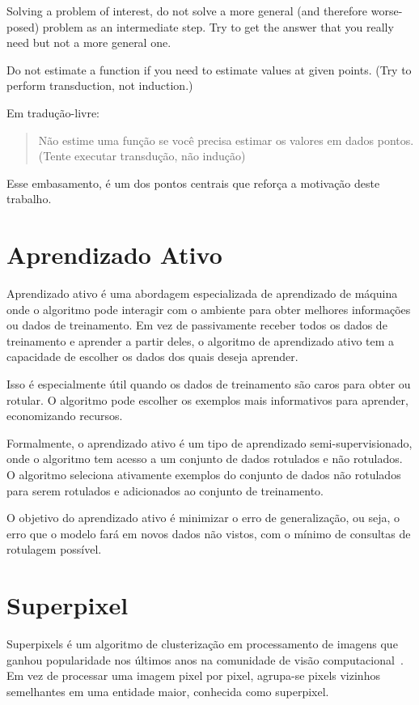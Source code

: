 \begin{displayquote}

  Solving a problem of interest, do not solve a more general (and therefore worse-
  posed) problem as an intermediate step. Try to get the answer that you really need
  but not a more general one.

  Do not estimate a function if you need to estimate values at given
  points. (Try to perform transduction, not induction.)

\end{displayquote}

Em tradução-livre: \blockquote{Não estime uma função se você precisa estimar
os valores em dados pontos. (Tente executar transdução, não
indução)}. Esse embasamento, é um dos pontos centrais que reforça a motivação deste trabalho.


\section{Aprendizado Ativo}\label{sec:teorica-aprendizado-ativo}

Aprendizado ativo é uma abordagem especializada de aprendizado de
máquina onde o algoritmo pode interagir com o ambiente para obter
melhores informações ou dados de treinamento. Em vez de passivamente
receber todos os dados de treinamento e aprender a partir deles, o
algoritmo de aprendizado ativo tem a capacidade de escolher os dados
dos quais deseja aprender.

Isso é especialmente útil quando os dados de treinamento são caros
para obter ou rotular. O algoritmo pode escolher os exemplos mais
informativos para aprender, economizando recursos.

Formalmente, o aprendizado ativo é um tipo de aprendizado
semi-supervisionado, onde o algoritmo tem acesso a um conjunto de
dados rotulados e não rotulados. O algoritmo seleciona ativamente
exemplos do conjunto de dados não rotulados para serem rotulados e
adicionados ao conjunto de treinamento.

O objetivo do aprendizado ativo é minimizar o erro de generalização,
ou seja, o erro que o modelo fará em novos dados não vistos, com o
mínimo de consultas de rotulagem possível.

\section{Superpixel}\label{sec:teorica-superpixel}

Superpixels é um algoritmo de clusterização em processamento de
imagens que ganhou popularidade nos últimos anos na comunidade de
visão computacional~\cite{SuperpixelSurvey2020}. Em vez de processar
uma imagem pixel por pixel, agrupa-se pixels vizinhos semelhantes em
uma entidade maior, conhecida como superpixel.

